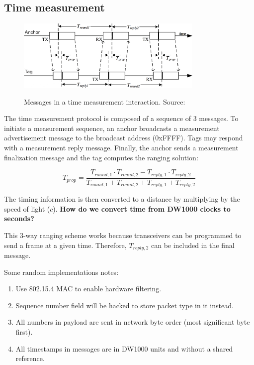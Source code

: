 \documentclass[a4paper]{scrreprt}
\begin{document}
\subsection{Time measurement}

\begin{figure}[h]
    \centering
    \includegraphics[width=0.8\textwidth]{figures/ranging_protocol.png}
    \label{fig:ranging_protocol}
    \caption[Ranging protocol]{Messages in a time measurement interaction. Source:~\cite{dw1000manual}}
\end{figure}

The time measurement protocol is composed of a sequence of 3 messages.
To initiate a measurement sequence, an anchor broadcasts a measurement advertisement message to the broadcast address (0xFFFF).
Tags may respond with a measurement reply message.
Finally, the anchor sends a measurement finalization message and the tag computes the ranging solution:

\begin{equation}
T_{prop} = \frac{T_{round,1} \cdot T_{round,2} - T_{reply,1} \cdot T_{reply,2}}{T_{round,1} + T_{round,2} + T_{reply,1} + T_{reply,2}}
\label{eqn:ranging}
\end{equation}

The timing information is then converted to a distance by multiplying by the speed of light ($c$).
\textbf{How do we convert time from DW1000 clocks to seconds?}

This 3-way ranging scheme works because transceivers can be programmed to send a frame at a given time.
Therefore, $T_{reply,2}$ can be included in the final message.

Some random implementations notes:

\begin{enumerate}
    \item Use 802.15.4 MAC to enable hardware filtering.
    \item Sequence number field will be hacked to store packet type in it instead.
    \item All numbers in payload are sent in network byte order (most significant byte first).
    \item All timestamps in messages are in DW1000 units and without a shared reference.
\end{enumerate}
\end{document}
